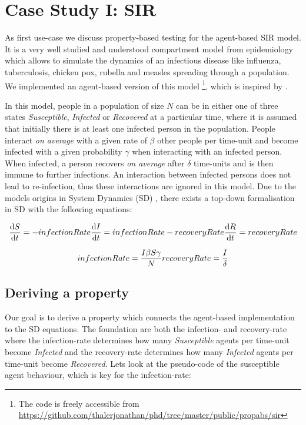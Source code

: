 \section{Case Study I: SIR}
\label{sec:case_SIR}

As first use-case we discuss property-based testing for the agent-based SIR model. It is a very well studied and understood compartment model from epidemiology \cite{kermack_contribution_1927} which allows to simulate the dynamics of an infectious disease like influenza, tuberculosis, chicken pox, rubella and measles spreading through a population. We implemented an agent-based version of this model \footnote{The code is freely accessible from \url{https://github.com/thalerjonathan/phd/tree/master/public/propabs/sir}}, which is inspired by \cite{macal_agent-based_2010}.

In this model, people in a population of size $N$ can be in either one of three states \textit{Susceptible}, \textit{Infected} or \textit{Recovered} at a particular time, where it is assumed that initially there is at least one infected person in the population. People interact \textit{on average} with a given rate of $\beta$ other people per time-unit and become infected with a given probability $\gamma$ when interacting with an infected person. When infected, a person recovers \textit{on average} after $\delta$ time-units and is then immune to further infections. An interaction between infected persons does not lead to re-infection, thus these interactions are ignored in this model. Due to the models origins in System Dynamics (SD) \cite{porter_industrial_1962}, there exists a top-down formalisation in SD with the following equations:

\begin{equation}
\frac{\mathrm d S}{\mathrm d t} = -infectionRate \\ 
\frac{\mathrm d I}{\mathrm d t} = infectionRate - recoveryRate \\ 
\frac{\mathrm d R}{\mathrm d t} = recoveryRate 
\end{equation}

\begin{equation}
infectionRate = \frac{I \beta S \gamma}{N} \\
recoveryRate = \frac{I}{\delta} 
\end{equation}

\subsection{Deriving a property}
Our goal is to derive a property which connects the agent-based implementation to the SD equations. The foundation are both the infection- and recovery-rate where the infection-rate determines how many \textit{Susceptible} agents per time-unit become \textit{Infected} and the recovery-rate determines how many \textit{Infected} agents per time-unit become \textit{Recovered}. Lets look at the pseudo-code of the susceptible agent behaviour, which is key for the infection-rate:

